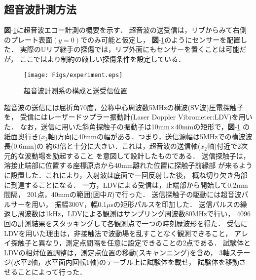 \subsection{超音波計測方法}
{\bf 図}-\ref{fig:experiment}に超音波エコー計測の概要を示す．
超音波の送受信は，リブからみて右側のプレート表面$(y=0)$でのみ可能と仮定し，
{\bf 図}-\ref{fig:experiment}のようにセンサーを配置した．
実際のUリブ継手の探傷では，リブ外面にもセンサーを置くことは可能だが，
ここではより制約の厳しい探傷条件を設定している．
\begin{figure}[thb]
\centering
	\texttt{[image: Figs/experiment.eps]}
	\caption{超音波計測系の構成と送受信位置}
	\label{fig:experiment}
\end{figure}
超音波の送信には屈折角70度，公称中心周波数5MHzの横波(SV波)圧電探触子を，
受信にはレーザードップラー振動計(Laser Doppler Vibrometer:LDV)を用いた．
%
なお，送信に用いた斜角探触子の振動子は10mm$\times$40mmの矩形で，{\bf 図}-\ref{fig:experiment}
の紙面奥行き($x_3$軸)方向に40mmの幅がある．つまり，送信源幅は5MHzでの横波波長(0.6mm)の
約63倍と十分に大きい．これは，超音波の送信軸($x_2$軸)付近で2次元的な波動場を励起すること
を意図して設計したものである．
%
送信探触子は，溶接止端部に位置する座標原点から40mm離れた位置に探触子前縁部
が来るように設置した．これにより，入射波は底面で一回反射した後，
概ね切り欠き角部に到達することになる．
一方，LDVによる受信は，止端部から開始して0.2mm間隔，
201点，40mmの範囲(図中$R$)で行った．
送信探触子の駆動には超音波パルサーを用い，
振幅300V，幅0.1$\mu$sの矩形パルスを印加した．
%
送信パルスの繰返し周波数は1kHz，LDVによる観測はサンプリング周波数80MHzで行い，
4096回の計測結果をスタッキングして各観測点で一つの時刻歴波形を得た．
%
受信にLDVを用いた理由は，非接触法で波動場を乱すことなく観測できること，
アレイ探触子と異なり，測定点間隔を任意に設定できることの2点である．
試験体とLDVの相対位置調整は，測定点位置の移動(スキャンニング)を含め，
3軸ステージ(水平2軸，水平面内回転1軸)のテーブル上に試験体を載せ，
試験体を移動させることによって行った．
